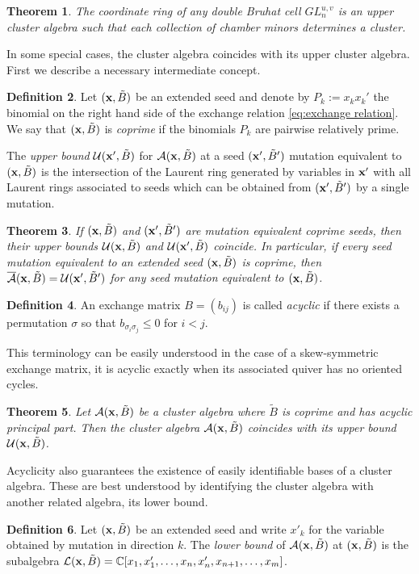 \documentclass{amsart}
\newtheorem{theorem}{Theorem}[section]
\theoremstyle{definition}
\newtheorem{definition}[theorem]{Definition}
\theoremstyle{remark}
\numberwithin{equation}{section}
\newcommand{\cA}{{\mathcal{A}}}
\newcommand{\cL}{{\mathcal{L}}}
\newcommand{\cU}{{\mathcal{U}}}
\newcommand{\x}{{\bf x}}
\newcommand{\bx}{{\bf x}}
\newcommand{\CC}{{\mathbb{C}}}
\begin{document}
  \begin{theorem}\label{th:dbc is uca}\cite{BFZ05}
    The coordinate ring of any double Bruhat cell $GL_n^{u,v}$ is an upper cluster algebra such that each collection of chamber minors determines a cluster.
  \end{theorem}

  In some special cases, the cluster algebra coincides with its upper cluster algebra.  First we describe a necessary intermediate concept.
  \begin{definition}\label{def:coprime}
    Let $(\bx,\tilde B)$ be an extended seed and denote by $P_k:=x_kx_k'$ the binomial on the right hand side of the exchange relation \eqref{eq:exchange relation}.  We say that $(\bx,\tilde B)$ is \emph{coprime} if the binomials $P_k$ are pairwise relatively prime.
  \end{definition}
  The \emph{upper bound} $\cU(\bx',\tilde B)$ for $\cA(\bx,\tilde B)$ at a seed $(\bx',\tilde B')$ mutation equivalent to $(\bx,\tilde B)$ is the intersection of the Laurent ring generated by variables in $\bx'$ with all Laurent rings associated to seeds which can be obtained from $(\bx',\tilde B')$ by a single mutation.
  \begin{theorem}\cite{BFZ05}
    If $(\bx,\tilde B)$ and $(\bx',\tilde B')$ are mutation equivalent coprime seeds, then their upper bounds $\cU(\bx,\tilde B)$ and $\cU(\bx',\tilde B)$ coincide.  In particular, if every seed mutation equivalent to an extended seed $(\bx,\tilde B)$ is coprime, then $\overline{\cA}(\bx,\tilde B)=\cU(\bx',\tilde B')$ for any seed mutation equivalent to $(\bx,\tilde B)$.
  \end{theorem}

  \begin{definition}
    An exchange matrix $B=(b_{ij})$ is called \emph{acyclic} if there exists a permutation $\sigma$ so that $b_{\sigma_i\sigma_j}\le 0$ for $i<j$.
  \end{definition}
  This terminology can be easily understood in the case of a skew-symmetric exchange matrix, it is acyclic exactly when its associated quiver has no oriented cycles.
  \begin{theorem}\cite{BFZ05}\label{th:acyclic upper bounds}
    Let $\cA(\x,\tilde B)$ be a cluster algebra where $\tilde B$ is coprime and has acyclic principal part.  Then the cluster algebra $\cA(\x,\tilde B)$ coincides with its upper bound $\cU(\x,\tilde B)$.
  \end{theorem}

  Acyclicity also guarantees the existence of easily identifiable bases of a cluster algebra.  These are best understood by identifying the cluster algebra with another related algebra, its lower bound.
  \begin{definition}
    Let $(\x,\tilde B)$ be an extended seed and write $x'_k$ for the variable obtained by mutation in direction $k$.  The \emph{lower bound} of $\cA(\x,\tilde B)$ at $(\x,\tilde B)$ is the subalgebra $\cL(\x,\tilde B)=\CC[x_1,x'_1,\ldots,x_n,x'_n,x_{n+1},\ldots,x_m]$.
  \end{definition}
\end{document}
